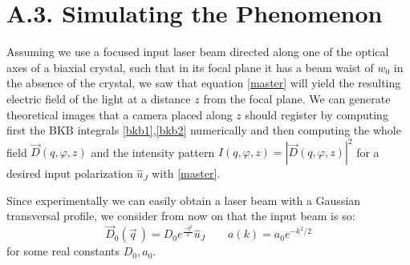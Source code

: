 \documentclass[11pt, a4paper, twoside]{article} %
\begin{document}
\section*{A.3. Simulating the Phenomenon \vspace{-0.1cm} }
Assuming we use a focused input laser beam directed along one of the optical axes of a biaxial crystal, such that in its focal plane it has a beam waist of $w_0$ in the absence of the crystal, we saw that equation \eqref{master} will yield the resulting electric field of the light at a distance $z$ from the focal plane.    We can generate theoretical images that a camera placed along $z$ should register by computing first the BKB integrals \eqref{bkb1},\eqref{bkb2} numerically and then computing the whole field $\vec{D}(q,\varphi,z)$ and the intensity pattern $I(q,\varphi,z)=|\vec{D}(q,\varphi,z)|^2$  for a desired input polarization $\hat{u}_J$ with \eqref{master}.

Since experimentally we can easily obtain a laser beam with a Gaussian transversal profile, we consider from now on that the input beam is so:\vspace{-0.15cm}
\begin{equation}\label{Four}
\vec{D}_0(\vec{q}\,)=D_0e^{\frac{-q^2}{2}}\hat{u}_J \quad \quad a(k)=a_0e^{-k^2/2}
\end{equation}
for some real constants $D_0,a_0$.
\end{document}
